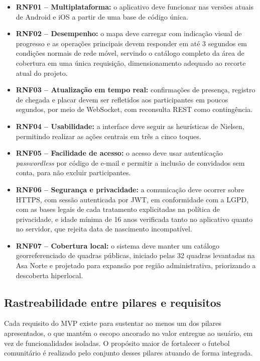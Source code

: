       \begin{itemize}
          \item \textbf{RNF01 – Multiplataforma:} o aplicativo deve funcionar nas versões atuais de Android e iOS a partir de uma base de código única.

          \item \textbf{RNF02 – Desempenho:} o mapa deve carregar com indicação visual de progresso e as operações principais devem responder em até 3 segundos em condições normais de rede móvel, servindo o catálogo completo da área de cobertura em uma única requisição, dimensionamento adequado ao recorte atual do projeto.

          \item \textbf{RNF03 – Atualização em tempo real:} confirmações de presença, registro de chegada e placar devem ser refletidos aos participantes em poucos segundos, por meio de WebSocket, com reconsulta REST como contingência.

          \item \textbf{RNF04 – Usabilidade:} a interface deve seguir as heurísticas de Nielsen, permitindo realizar as ações centrais em três a cinco toques.

          \item \textbf{RNF05 – Facilidade de acesso:} o acesso deve usar autenticação \textit{passwordless} por código de e-mail e permitir a inclusão de convidados sem conta, para não excluir participantes.

          \item \textbf{RNF06 – Segurança e privacidade:} a comunicação deve ocorrer sobre HTTPS, com sessão autenticada por JWT, em conformidade com a LGPD, com as bases legais de cada tratamento explicitadas na política de privacidade, e idade mínima de 16 anos verificada tanto no aplicativo quanto no servidor, que rejeita data de nascimento incompatível.

          \item \textbf{RNF07 – Cobertura local:} o sistema deve manter um catálogo georreferenciado de quadras públicas, iniciado pelas 32 quadras levantadas na Asa Norte e projetado para expansão por região administrativa, priorizando a descoberta hiperlocal.
      \end{itemize}

    \subsection{Rastreabilidade entre pilares e requisitos}
      Cada requisito do MVP existe para sustentar ao menos um dos pilares apresentados, o que mantém o escopo ancorado no valor entregue ao usuário, em vez de funcionalidades isoladas. O propósito maior de fortalecer o futebol comunitário é realizado pelo conjunto desses pilares atuando de forma integrada.

